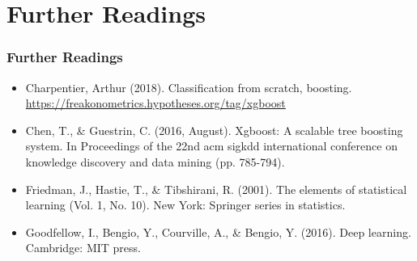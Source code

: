 \documentclass[
  shownotes,
  xcolor={svgnames},
  hyperref={colorlinks,citecolor=DarkBlue,linkcolor=DarkRed,urlcolor=DarkBlue}
  , aspectratio=169]{beamer}
\begin{document}
\section{Further Readings}
\begin{frame}
\frametitle{Further Readings}

\begin{itemize}

  \item Charpentier, Arthur (2018). Classification from scratch, boosting. \url{https://freakonometrics.hypotheses.org/tag/xgboost}
  \medskip
  \item Chen, T., \& Guestrin, C. (2016, August). Xgboost: A scalable tree boosting system. In Proceedings of the 22nd acm sigkdd international conference on knowledge discovery and data mining (pp. 785-794).
  \medskip
  \item Friedman, J., Hastie, T., \& Tibshirani, R. (2001). The elements of statistical learning (Vol. 1, No. 10). New York: Springer series in statistics.
  \medskip
  \item Goodfellow, I., Bengio, Y., Courville, A., \& Bengio, Y. (2016). Deep learning. Cambridge: MIT press.

  
\end{itemize}

\end{frame}


\appendix
{}
\setcounter{finalframe}{\value{framenumber}}
\normalsize


\end{document}
